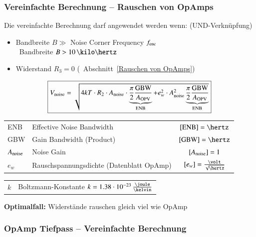 \subsubsection{Vereinfachte Berechnung -- Rauschen von OpAmps}

Die vereinfachte Berechnung darf angewendet werden wenn: (UND-Verknüpfung)
\begin{itemize}
    \item Bandbreite $B \gg$ Noise Corner Frequency $f_{\rm enc}$ \\
        \textrightarrow\ Bandbreite $B > 10 \, \kilo \hertz$
    \item Widerstand $R_3 = 0$ (\textrightarrow\ Abschnitt~\ref{Rauschen von OpAmps})
\end{itemize}

$$ \boxed{ V_{\rm noise} = \sqrt{4 k T \cdot R_2 \cdot A_{\rm noise} \cdot \underbrace{ \frac{\pi}{2} \frac{\text{GBW}}{A_{\rm OPV}} }_{\text{ENB}}
+ e_w^2 \cdot A_{\rm noise}^2 \underbrace{ \frac{\pi}{2} \frac{\text{GBW}}{A_{\rm OPV}} }_{\text{ENB}} }} $$

\begin{tabular}{llc}
    ENB             & Effective Noise Bandwidth                 & $[\text{ENB}] = \hertz$ \\
    GBW             & Gain Bandwidth (Product)                  & $[\text{GBW}] = \hertz$ \\
    $A_{\rm noise}$ & Noise Gain                                & $[A_{\rm noise}] = 1$ \\
    $e_w$           & Rauschspannungsdichte (Datenblatt OpAmp)  & $[e_w] = \frac{\volt}{\sqrt{\hertz}}$ \\
\end{tabular}

\begin{tabular}{ll}
    $k$             & Boltzmann-Konstante $k = 1.38 \cdot 10^{-23} \, \frac{\joule}{\kelvin}$ \\
\end{tabular}
    
\textbf{Optimalfall:} Widerstände rauschen gleich viel wie OpAmp


\subsubsection{OpAmp Tiefpass -- Vereinfachte Berechnung}

